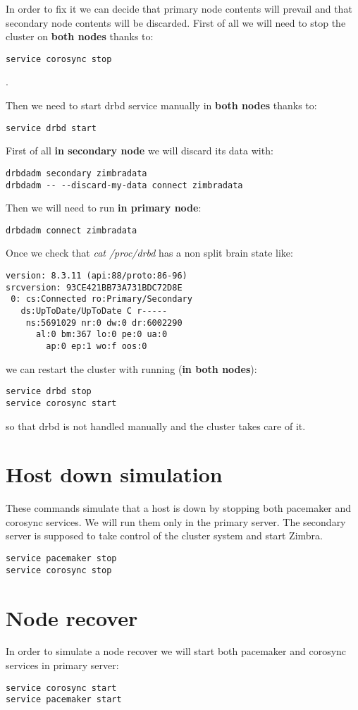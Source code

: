 In order to fix it we can decide that primary node contents will prevail and that secondary node contents will be discarded. First of all we will need to stop the cluster on \textbf{both nodes} thanks to:
\begin{verbatim}
service corosync stop
\end{verbatim}
.

Then we need to start drbd service manually in \textbf{both nodes} thanks to:
\begin{verbatim}
service drbd start
\end{verbatim}

First of all \textbf{in secondary node} we will discard its data with:
\begin{verbatim}
drbdadm secondary zimbradata
drbdadm -- --discard-my-data connect zimbradata
\end{verbatim}
Then we will need to run \textbf{in primary node}:
\begin{verbatim}
drbdadm connect zimbradata
\end{verbatim}

Once we check that \textit{cat /proc/drbd} has a non split brain state like:
\begin{verbatim}
version: 8.3.11 (api:88/proto:86-96)
srcversion: 93CE421BB73A731BDC72D8E 
 0: cs:Connected ro:Primary/Secondary
   ds:UpToDate/UpToDate C r-----
    ns:5691029 nr:0 dw:0 dr:6002290
      al:0 bm:367 lo:0 pe:0 ua:0
        ap:0 ep:1 wo:f oos:0
\end{verbatim}
we can restart the cluster with running (\textbf{in both nodes}):
\begin{verbatim}
service drbd stop
service corosync start
\end{verbatim}
so that drbd is not handled manually and the cluster takes care of it.

\section {Host down simulation}
These commands simulate that a host is down by stopping both pacemaker and corosync services. We will run them only in the primary server. The secondary server is supposed to take control of the cluster system and start Zimbra.

\begin{verbatim}
service pacemaker stop
service corosync stop
\end{verbatim}

\section {Node recover}
In order to simulate a node recover we will start both pacemaker and corosync services in primary server:
\begin{verbatim}
service corosync start
service pacemaker start
\end{verbatim}

